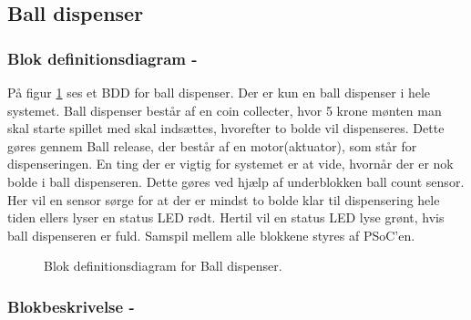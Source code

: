 \documentclass[Arkitektur/System_main.tex]{subfiles}
\begin{document}
\subsection{Ball dispenser} \label{sec:balldispenser_hardware}
\subsubsection{Blok definitionsdiagram - }

På figur \ref{fig:balldispenser_hardware_bdd} ses et BDD for ball dispenser. Der er kun en ball dispenser i hele systemet. Ball dispenser består af en coin collecter, hvor 5 krone mønten man skal starte spillet med skal indsættes, hvorefter to bolde vil dispenseres. Dette gøres gennem Ball release, der består af en motor(aktuator), som står for dispenseringen. En ting der er vigtig for systemet er at vide, hvornår der er nok bolde i ball dispenseren. Dette gøres ved hjælp af underblokken ball count sensor. Her vil en sensor sørge for at der er mindst to bolde klar til dispensering hele tiden ellers lyser en status LED rødt. Hertil vil en status LED lyse grønt, hvis ball dispenseren er fuld. Samspil mellem alle blokkene styres af PSoC'en.

\begin{figure}[H]
    \centering
    \caption{Blok definitionsdiagram for Ball dispenser.}
    \label{fig:balldispenser_hardware_bdd}
\end{figure}

\subsubsection{Blokbeskrivelse - }
\end{document}
